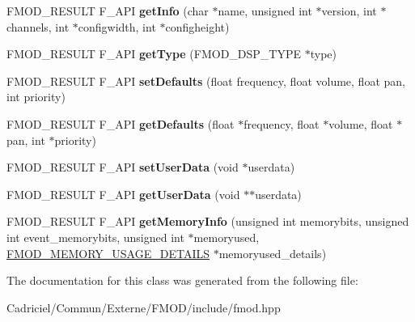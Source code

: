 \begin{DoxyCompactItemize}
\item 
\hypertarget{class_f_m_o_d_1_1_d_s_p_a5bb61015d7b0e835437e46ea4eaf6442}{F\-M\-O\-D\-\_\-\-R\-E\-S\-U\-L\-T F\-\_\-\-A\-P\-I {\bfseries get\-Info} (char $\ast$name, unsigned int $\ast$version, int $\ast$channels, int $\ast$configwidth, int $\ast$configheight)}\label{class_f_m_o_d_1_1_d_s_p_a5bb61015d7b0e835437e46ea4eaf6442}

\item 
\hypertarget{class_f_m_o_d_1_1_d_s_p_a7241c2669554667f90d4f2a576f64c4a}{F\-M\-O\-D\-\_\-\-R\-E\-S\-U\-L\-T F\-\_\-\-A\-P\-I {\bfseries get\-Type} (F\-M\-O\-D\-\_\-\-D\-S\-P\-\_\-\-T\-Y\-P\-E $\ast$type)}\label{class_f_m_o_d_1_1_d_s_p_a7241c2669554667f90d4f2a576f64c4a}

\item 
\hypertarget{class_f_m_o_d_1_1_d_s_p_a97919dbf4f783369b75f1bc43527489d}{F\-M\-O\-D\-\_\-\-R\-E\-S\-U\-L\-T F\-\_\-\-A\-P\-I {\bfseries set\-Defaults} (float frequency, float volume, float pan, int priority)}\label{class_f_m_o_d_1_1_d_s_p_a97919dbf4f783369b75f1bc43527489d}

\item 
\hypertarget{class_f_m_o_d_1_1_d_s_p_a80aa58e2f153dd3ad5fb6bf9305fc00e}{F\-M\-O\-D\-\_\-\-R\-E\-S\-U\-L\-T F\-\_\-\-A\-P\-I {\bfseries get\-Defaults} (float $\ast$frequency, float $\ast$volume, float $\ast$pan, int $\ast$priority)}\label{class_f_m_o_d_1_1_d_s_p_a80aa58e2f153dd3ad5fb6bf9305fc00e}

\item 
\hypertarget{class_f_m_o_d_1_1_d_s_p_a5aacd4725dbe50b725146bd6c412b0f4}{F\-M\-O\-D\-\_\-\-R\-E\-S\-U\-L\-T F\-\_\-\-A\-P\-I {\bfseries set\-User\-Data} (void $\ast$userdata)}\label{class_f_m_o_d_1_1_d_s_p_a5aacd4725dbe50b725146bd6c412b0f4}

\item 
\hypertarget{class_f_m_o_d_1_1_d_s_p_a1b9014166d1ad45923da3227d8db3439}{F\-M\-O\-D\-\_\-\-R\-E\-S\-U\-L\-T F\-\_\-\-A\-P\-I {\bfseries get\-User\-Data} (void $\ast$$\ast$userdata)}\label{class_f_m_o_d_1_1_d_s_p_a1b9014166d1ad45923da3227d8db3439}

\item 
\hypertarget{class_f_m_o_d_1_1_d_s_p_acac5f7f04e8e67719a712f848793e8f8}{F\-M\-O\-D\-\_\-\-R\-E\-S\-U\-L\-T F\-\_\-\-A\-P\-I {\bfseries get\-Memory\-Info} (unsigned int memorybits, unsigned int event\-\_\-memorybits, unsigned int $\ast$memoryused, \hyperlink{struct_f_m_o_d___m_e_m_o_r_y___u_s_a_g_e___d_e_t_a_i_l_s}{F\-M\-O\-D\-\_\-\-M\-E\-M\-O\-R\-Y\-\_\-\-U\-S\-A\-G\-E\-\_\-\-D\-E\-T\-A\-I\-L\-S} $\ast$memoryused\-\_\-details)}\label{class_f_m_o_d_1_1_d_s_p_acac5f7f04e8e67719a712f848793e8f8}

\end{DoxyCompactItemize}


The documentation for this class was generated from the following file\-:\begin{DoxyCompactItemize}
\item 
Cadriciel/\-Commun/\-Externe/\-F\-M\-O\-D/include/fmod.\-hpp\end{DoxyCompactItemize}
